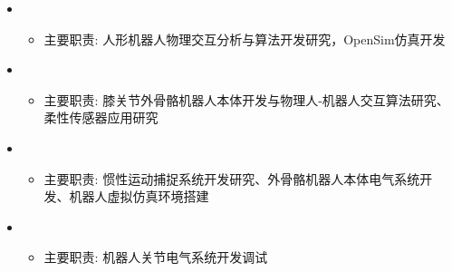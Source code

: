   \begin{itemize}[leftmargin=*]
    \item
      {\small
      \begin{itemize}
        \item{主要职责: 人形机器人物理交互分析与算法开发研究，OpenSim仿真开发}
      \end{itemize}}
    \item
      {\small
      \begin{itemize}
        \item{主要职责: 膝关节外骨骼机器人本体开发与物理人-机器人交互算法研究、柔性传感器应用研究}
      \end{itemize}}
    \item
      {\small
      \begin{itemize}
        \item{主要职责: 惯性运动捕捉系统开发研究、外骨骼机器人本体电气系统开发、机器人虚拟仿真环境搭建}
      \end{itemize}}
    \item
      {\small
      \begin{itemize}
        \item{主要职责: 机器人关节电气系统开发调试}
      \end{itemize}}
  \end{itemize}